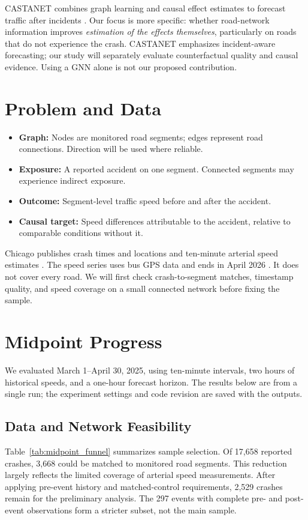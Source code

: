 \documentclass[sigconf,nonacm]{acmart}
\begin{document}
CASTANET combines graph learning and causal effect estimates to
forecast traffic after incidents \cite{kitahara2026castanet}.
Our focus is more specific: whether road-network information improves
\emph{estimation of the effects themselves}, particularly on roads
that do not experience the crash. CASTANET emphasizes incident-aware
forecasting; our study will separately evaluate counterfactual quality
and causal evidence. Using a GNN alone is not our proposed contribution.

\section{Problem and Data}
\begin{itemize}
    \item \textbf{Graph:} Nodes are monitored road segments; edges
    represent road connections. Direction will be used where reliable.
    \item \textbf{Exposure:} A reported accident on one segment.
    Connected segments may experience indirect exposure.
    \item \textbf{Outcome:} Segment-level traffic speed before and
    after the accident.
    \item \textbf{Causal target:} Speed differences attributable to
    the accident, relative to comparable conditions without it.
\end{itemize}

Chicago publishes crash times and locations and ten-minute arterial
speed estimates \cite{chicagoCrashes,chicagoSpeeds}. The speed series
uses bus GPS data and ends in April 2026
\cite{chicagoTrackerNotice}. It does not cover every road. We will
first check crash-to-segment matches, timestamp quality, and speed
coverage on a small connected network before fixing the sample.


\section{{Midpoint Progress}}
{We evaluated March 1--April 30, 2025, using ten-minute
intervals, two hours of historical speeds, and a one-hour forecast
horizon. The results below are from a single run; the
experiment settings and code revision are saved with the outputs.}

\subsection{{Data and Network Feasibility}}
{Table~\ref{tab:midpoint_funnel} summarizes sample
selection. Of 17{,}658 reported crashes, 3{,}668 could be matched to
monitored road segments. This reduction largely reflects the limited
coverage of arterial speed measurements. After applying pre-event
history and matched-control requirements, 2{,}529 crashes remain for
the preliminary analysis. The 297 events with complete pre- and
post-event observations form a stricter subset, not the main sample.}
\end{document}
